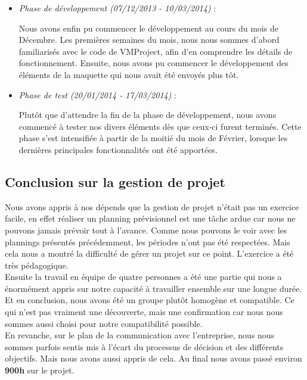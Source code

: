 \documentclass[12pt]{report}
\begin{document}
\begin{itemize}
\item \emph{Phase de développement (07/12/2013 - 10/03/2014)} :

Nous avons enfin pu commencer le développement au cours du mois de Décembre. Les premières semaines du mois, nous nous sommes d’abord familiarisés avec le code de VMProject, afin d’en comprendre les détails de fonctionnement. Ensuite, nous avons pu commencer le développement des éléments de la maquette qui nous avait été envoyés plus tôt.\\

\item \emph{Phase de test (20/01/2014 - 17/03/2014)} :

Plutôt que d'attendre la fin de la phase de développement, nous avons commencé à tester nos divers éléments dès que ceux-ci furent terminés. Cette phase s'est intensifiée à partir de la moitié du mois de Février, lorsque les dernières principales fonctionnalités ont été apportées.\\
\end{itemize}

	\subsection{Conclusion sur la gestion de projet}
	
	Nous avons appris à nos dépends que la gestion de projet n'était pas un exercice facile, en effet réaliser un planning prévisionnel est une tâche ardue car nous ne pouvons jamais prévoir tout à l'avance. Comme nous pouvons le voir avec les plannings présentés précédemment, les périodes n'ont pas été respectées. Mais cela nous a montré la difficulté de gérer un projet sur ce point. L'exercice a été très pédagogique.\\
	
	Ensuite la travail en équipe de quatre personnes a été une partie qui nous a énormément appris sur notre capacité à travailler ensemble sur une longue durée. Et en conclusion, nous avons été un groupe plutôt homogène et compatible. Ce qui n'est pas vraiment une découverte, mais une confirmation car nous nous sommes aussi choisi pour notre compatibilité possible.\\
	
	En revanche, sur le plan de la communication avec l'entreprise, nous nous sommes parfois sentis mis à l'écart du processus de décision et des différents objectifs. Mais nous avons aussi appris de cela. Au final nous avons passé environ \textbf{900h} sur le projet.\\
\end{document}
